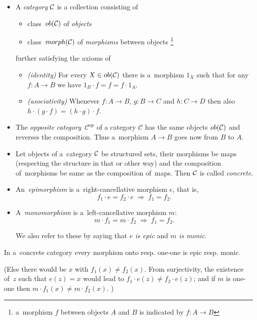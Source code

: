 \begin{itemize}
\item A \emph{category} $\mathcal{C}$ is a collection consisting of
  \begin{itemize}
  \item class~$ob(\mathcal{C})$ of \emph{objects\/}
  \item class~$morph(\mathcal{C})$ of \emph{morphisms\/} between objects\thinspace%
  \footnote{a~morphism $f$ between objects $A$ and $B$ is indicated by $f\colon
    A \to B$}
  \end{itemize}
further satisfying the axioms of
  \begin{itemize}
  \item \emph{(identity)\/}
  For every $X\in ob(\mathcal{C})$ there is a~morphism $1_X$ such that for any
  $f\colon A \to B$ we have $1_B \cdot f = f = f \cdot 1_A$.
  \item \emph{(asociativity)\/}
  Whenever $f\colon A \to B$, $g\colon B \to C$ and $h\colon C \to D$ then also $h
  \cdot (g \cdot f) = (h \cdot g) \cdot f$.
  \end{itemize}

\item The \emph{opposite category}~$\mathcal{C}^{op}$ of a category
$\mathcal{C}$ has the same objects $ob(\mathcal{C})$ and reverses the composition.
Thus a~morphism $A \to B$ goes now from $B$ to $A$.

\item Let objects of a~category $\mathcal{C}$ be structured sets, their morphisms be
maps (respecting the structure in that or other way) and the composition
of~morphisms be same as the composition of~maps.
Then $\mathcal{C}$ is called \emph{concrete\/}.

\item An~\emph{epimorphism} is a~right-cancellative morphism $e$, that is,
\[
  f_1 \cdot e = f_2 \cdot e \; \Longrightarrow \; f_1 = f_2.
\]

\item A~\emph{monomorphism} is a~left-cancellative morphism $m$:
\[
  m \cdot f_1 = m \cdot f_2 \; \Longrightarrow \; f_1 = f_2.
\]

We also refer to these by saying that \emph{$e$ is epic\/} and \emph{$m$ is
monic\/}.
\end{itemize}

\begin{fact} \label{fct:onto->epic}
  In a~concrete category every morphism onto resp. one-one is epic resp. monic.
\end{fact}
(Else there would be $x$ with $f_1(x) \ne f_2(x)$.
 From surjectivity, the existence of~$z$ such that $e(z) = x$ would lead to
 $f_1 \cdot e(z) \ne f_2 \cdot e(z)$;
 and if $m$ is one-one then $m \cdot f_1(x) \ne m \cdot f_2(x)$.
 )

